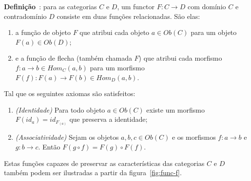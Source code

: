 \documentclass[10pt, conference]{IEEEtran}
\begin{document}
\textbf{Definição}~\cite{maclane1971mat, spivak2014cts}: para as categorias $C$ e $D$, um functor $F:C \rightarrow D$ com domínio $C$ e contradomínio $D$ consiste em duas funções relacionadas. São elas:

\begin{enumerate}[label=(\alph*), leftmargin=3em, topsep = 0pt, itemsep = 1ex, partopsep = 1ex, parsep = 1ex]
	\item a função de objeto $F$ que atribui cada objeto $a \in Ob(C)$ para um objeto $F(a) \in Ob(D)$;
	\item e a função de flecha (também chamada $F$) que atribui cada morfismo $f: a \rightarrow b \in Hom_C(a, b)$ para um morfismo $F(f):F(a) \rightarrow F(b) \in Hom_D(a, b)$.
\end{enumerate}

Tal que os seguintes axiomas são satisfeitos:

\begin{enumerate}[label={}, leftmargin = 2em, topsep = 0pt, itemsep = 1ex,partopsep = 1ex, parsep = 1ex]
	\item \textit{(Identidade)} Para todo objeto $a \in Ob(C)$ existe um morfismo $F(id_a) = id_{F_{(a)}}$ que preserva a identidade;
	\item \textit{(Associatividade)} Sejam os objetos $a, b, c \in Ob(C)$ e os morfismos $f: a \rightarrow b$ e $g: b \rightarrow c$. Então $F(g \circ  f) = F(g) \circ F(f)$.
\end{enumerate}

\bigskip

Estas funções capazes de preservar as características das categorias $C$ e $D$ também podem ser ilustradas a partir da figura~\ref{fig:func-f}.
\end{document}
